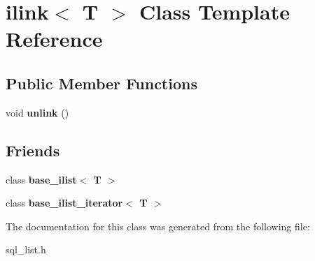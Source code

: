 \hypertarget{classilink}{}\section{ilink$<$ T $>$ Class Template Reference}
\label{classilink}
\subsection*{Public Member Functions}
\begin{DoxyCompactItemize}
\item 
\mbox{\label{classilink_a112bb839ca014e01a3f213038bb8ec41}} 
void {\bfseries unlink} ()
\end{DoxyCompactItemize}
\subsection*{Friends}
\begin{DoxyCompactItemize}
\item 
\mbox{\label{classilink_a24669a9030532ec0a184e4f64f5851b7}} 
class {\bfseries base\+\_\+ilist$<$ T $>$}
\item 
\mbox{\label{classilink_a5f6322da57ee6c6390276f21b3971a3d}} 
class {\bfseries base\+\_\+ilist\+\_\+iterator$<$ T $>$}
\end{DoxyCompactItemize}


The documentation for this class was generated from the following file\+:\begin{DoxyCompactItemize}
\item 
sql\+\_\+list.\+h\end{DoxyCompactItemize}
